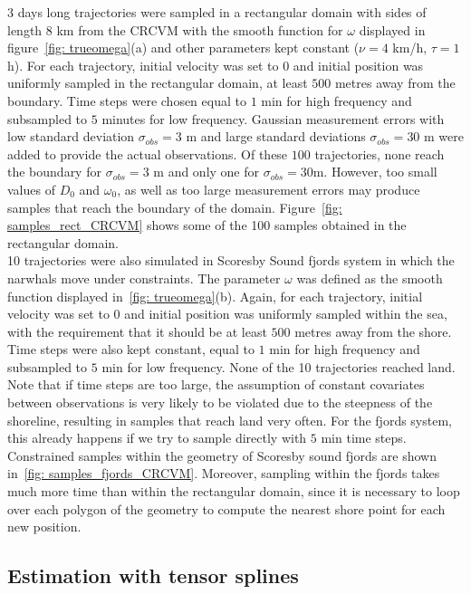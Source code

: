 \documentclass[11pt]{article}
\newcommand {\1}{\mathbb{1}}
\begin{document}
$3$ days long trajectories were sampled in a rectangular domain with sides of length $8$ km from the CRCVM with the smooth function for $\omega$ displayed in figure~\ref{fig: trueomega}(a) and other parameters kept constant ($\nu = 4$ km/h, $\tau=1$ h). For each trajectory, initial velocity was set to $0$ and initial position was uniformly sampled in the rectangular domain, at least $500$ metres away from the boundary. Time steps were chosen equal to $1$ min for high frequency and subsampled to $5$ minutes for low frequency. Gaussian measurement errors with low standard deviation $\sigma_{obs}=3$ m and large standard deviations $\sigma_{obs}=30$ m were added to provide the actual observations. Of these $100$ trajectories, none reach the boundary for $\sigma_{obs}=3$ m and only one for $\sigma_{obs}=30$m. However, too small values of $D_0$ and $\omega_0$, as well as too large measurement errors may produce samples that reach the boundary of the domain. Figure~\ref{fig: samples_rect_CRCVM} shows some of the 100 samples obtained in the rectangular domain. \\


10 trajectories were also simulated in Scoresby Sound fjords system in which the narwhals move under constraints. The parameter $\omega$ was defined as the smooth function displayed in~\ref{fig: trueomega}(b). Again, for each trajectory, initial velocity was set to $0$ and initial position was uniformly sampled within the sea, with the requirement that it should be at least $500$ metres away from the shore. Time steps were also kept constant, equal to $1$ min for high frequency and subsampled to $5$ min for low frequency. None of the 10 trajectories reached land. Note that if time steps are too large, the assumption of constant covariates between observations is very likely to be violated due to the steepness of the shoreline, resulting in samples that reach land very often. For the fjords system, this already happens if we try to sample directly with $5$ min time steps. Constrained samples within the geometry of Scoresby sound fjords are shown in~\ref{fig: samples_fjords_CRCVM}. Moreover, sampling within the fjords takes much more time than within the rectangular domain, since it is necessary to loop over each polygon of the geometry to compute the nearest shore point for each new position. 



\subsection{Estimation with tensor splines}
\end{document}
